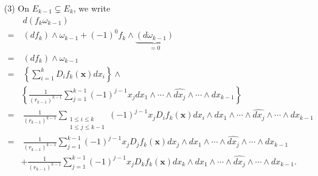 \documentclass{article}
\begin{document}
\begin{enumerate}
\item[(3)]
  On $E_{k-1} \subsetneq E_k$, we write
  \begin{align*}
    & \: d(f_k \omega_{k-1}) \\
    =& \: (df_k) \wedge \omega_{k-1} + (-1)^{0} f_k \wedge \underbrace{(d\omega_{k-1})}_{=0} \\
    =& \: (df_k) \wedge \omega_{k-1} \\
    =& \: \left\{
        \sum_{i=1}^{k} D_i f_k(\mathbf{x}) dx_i
      \right\}
      \wedge \\
      &\left\{
        \frac{1}{(r_{k-1})^{k-1}}
        \sum_{j=1}^{k-1} (-1)^{j-1} x_j dx_1 \wedge \cdots
        \wedge \widehat{dx_j} \wedge \cdots \wedge dx_{k-1}
      \right\} \\
    =& \: \frac{1}{(r_{k-1})^{k-1}}
      \sum_{\substack{1 \leq i \leq k \\ 1 \leq j \leq k-1}}
      (-1)^{j-1} x_j D_i f_k(\mathbf{x})
      dx_i \wedge dx_1 \wedge \cdots
        \wedge \widehat{dx_j} \wedge \cdots \wedge dx_{k-1} \\
    =& \: \frac{1}{(r_{k-1})^{k-1}}
      \sum_{j=1}^{k-1}
      (-1)^{j-1} x_j D_j f_k(\mathbf{x})
      dx_j \wedge dx_1 \wedge \cdots
        \wedge \widehat{dx_j} \wedge \cdots \wedge dx_{k-1} \\
      &+
      \frac{1}{(r_{k-1})^{k-1}}
      \sum_{j=1}^{k-1}
      (-1)^{j-1} x_j D_k f_k(\mathbf{x})
      dx_k \wedge dx_1 \wedge \cdots
        \wedge \widehat{dx_j} \wedge \cdots \wedge dx_{k-1}.
  \end{align*}


\end{enumerate}
\end{document}
